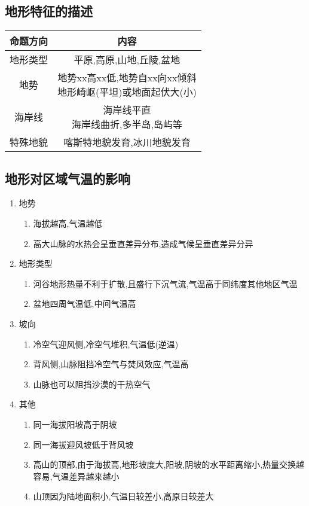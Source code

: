 \documentclass[a4paper]{article}
\begin{document}
    \subsection{地形特征的描述}
        \begin{tabular}{|c|c|}
            \hline
            命题方向    &   内容    \\
            \hline
            地形类型    &   平原,高原,山地,丘陵,盆地    \\
            \hline
            地势    &    \makecell[c]{地势xx高xx低,地势自xx向xx倾斜\\地形崎岖(平坦)或地面起伏大(小)}   \\
            \hline
            海岸线    &    \makecell[c]{海岸线平直\\海岸线曲折,多半岛,岛屿等}   \\
            \hline
            特殊地貌    &    喀斯特地貌发育,冰川地貌发育   \\
            \hline
        \end{tabular}
    \subsection{地形对区域气温的影响}
    \begin{enumerate}
        \item 地势
        \begin{enumerate}
            \item 海拔越高,气温越低
            \item 高大山脉的水热会呈垂直差异分布,造成气候呈垂直差异分异
        \end{enumerate}
        \item 地形类型
        \begin{enumerate}
            \item 河谷地形热量不利于扩散,且盛行下沉气流,气温高于同纬度其他地区气温
            \item 盆地四周气温低,中间气温高
        \end{enumerate}
        \item 坡向
        \begin{enumerate}
            \item 冷空气迎风侧,冷空气堆积,气温低(逆温)
            \item 背风侧,山脉阻挡冷空气与焚风效应,气温高
            \item 山脉也可以阻挡沙漠的干热空气
        \end{enumerate}
        \item 其他
        \begin{enumerate}
            \item 同一海拔阳坡高于阴坡
            \item 同一海拔迎风坡低于背风坡
            \item 高山的顶部,由于海拔高,地形坡度大,阳坡,阴坡的水平距离缩小,热量交换越容易,气温差异越来越小
            \item 山顶因为陆地面积小,气温日较差小,高原日较差大
        \end{enumerate}
    \end{enumerate}
\end{document}
